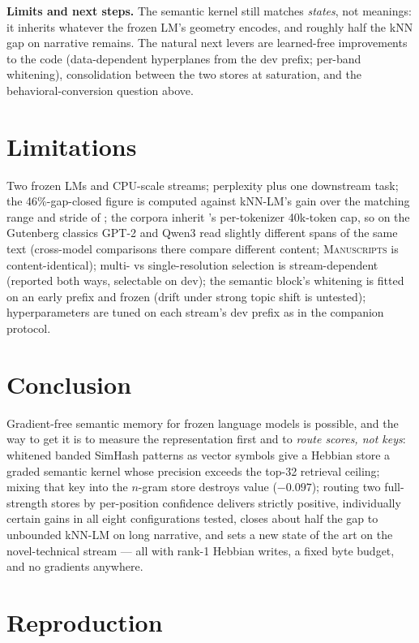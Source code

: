 \documentclass[11pt]{article}
\begin{document}
\textbf{Limits and next steps.} The semantic kernel still matches \emph{states}, not meanings: it inherits whatever the frozen LM's geometry encodes, and roughly half the kNN gap on narrative remains. The natural next levers are learned-free improvements to the code (data-dependent hyperplanes from the dev prefix; per-band whitening), consolidation between the two stores at saturation, and the behavioral-conversion question above.

\section{Limitations}

Two frozen LMs and CPU-scale streams; perplexity plus one downstream task; the 46\%-gap-closed figure is computed against kNN-LM's gain over the matching range and stride of \cite{sillage}; the corpora inherit \cite{sillage}'s per-tokenizer 40k-token cap, so on the Gutenberg classics GPT-2 and Qwen3 read slightly different spans of the same text (cross-model comparisons there compare different content; \textsc{Manuscripts} is content-identical); multi- vs single-resolution selection is stream-dependent (reported both ways, selectable on dev); the semantic block's whitening is fitted on an early prefix and frozen (drift under strong topic shift is untested); hyperparameters are tuned on each stream's dev prefix as in the companion protocol.

\section{Conclusion}

Gradient-free semantic memory for frozen language models is possible, and the way to get it is to measure the representation first and to \emph{route scores, not keys}: whitened banded SimHash patterns as vector symbols give a Hebbian store a graded semantic kernel whose precision exceeds the top-32 retrieval ceiling; mixing that key into the $n$-gram store destroys value ($-0.097$); routing two full-strength stores by per-position confidence delivers strictly positive, individually certain gains in all eight configurations tested, closes about half the gap to unbounded kNN-LM on long narrative, and sets a new state of the art on the novel-technical stream --- all with rank-1 Hebbian writes, a fixed byte budget, and no gradients anywhere.

\appendix

\section{Reproduction}
\end{document}
